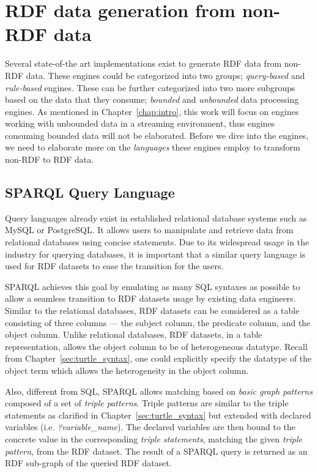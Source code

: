 \chapter{RDF data generation from non-RDF data}
Several state-of-the art implementations exist to generate RDF data from 
non-RDF data. These engines could be categorized into two groups; \emph{query-based} and 
\emph{rule-based} engines. These can be further categorized into two more subgroups 
based on the data that they consume; \emph{bounded} and \emph{unbounded} data processing 
engines. As mentioned in Chapter~\ref{chap:intro}, this work will focus on 
engines working with unbounded data in a streaming environment, thus engines 
consuming bounded data will not be elaborated. Before we dive into 
the engines, we need to elaborate more on the \emph{languages} these engines 
employ to transform non-RDF to RDF data. 


\section{SPARQL Query Language}
Query languages already exist in established relational database systems such as 
MySQL or PostgreSQL. It allows users to manipulate and retrieve data 
from relational databases using concise statements. Due to its widespread 
usage in the industry for querying databases, it is important that a similar 
query language is used for RDF datasets to ease the transition for the users. 

SPARQL\cite{sparql} achieves this goal by emulating as many SQL syntaxes as possible to allow 
a seamless transition to RDF datasets usage by existing data engineers. 
Similar to the relational databases, RDF 
datasets can be considered as a table consisting of three columns --- the subject column, 
the predicate column, and the object column. Unlike relational databases, 
RDF datasets, in a table representation, allows the object column to be of heterogeneous datatype. 
Recall from Chapter~\ref{sec:turtle_syntax}, one could explicitly specify the 
datatype of the object term which allows the heterogeneity in the object column.


Also, different from SQL, SPARQL allows matching based on \emph{basic graph patterns} composed 
of a set of \emph{triple patterns}. Triple patterns are similar to the triple statements 
as clarified in Chapter~\ref{sec:turtle_syntax} but extended with declared variables (i.e. \emph{?variable\_name}). 
The declared variables are then bound to the concrete value in the corresponding \emph{triple statements},
matching the given \emph{triple pattern}, from the RDF dataset. 
The result of a SPARQL query is returned as an RDF sub-graph of the queried RDF dataset. 

